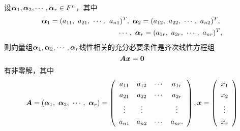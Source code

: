 \begin{frame}
\begin{dingli}
  设$\boldsymbol{\alpha}_1,\boldsymbol{\alpha}_2,\cdots,\boldsymbol{\alpha}_r\in F^n$，其中
  $$
  \begin{aligned}
    \boldsymbol{\alpha}_1 = (a_{11},~a_{21},~\cdots,~a_{n1})^T,~
    \boldsymbol{\alpha}_2 = (a_{12},~a_{22},~\cdots,~a_{n2})^T,~\\
    \cdots,~
    \boldsymbol{\alpha}_r = (a_{1r},~a_{2r},~\cdots,~a_{nr})^T,
  \end{aligned}
  $$
  则向量组$\boldsymbol{\alpha}_1,\boldsymbol{\alpha}_2,\cdots,\boldsymbol{\alpha}_r$线性相关的充分必要条件是齐次线性方程组
  \begin{equation}\label{ax}
    \boldsymbol{A} {\boldsymbol{x}} = \boldsymbol{0}
  \end{equation}
  有非零解，其中
  $$
  \boldsymbol{A} = (\boldsymbol{\alpha}_1,~\boldsymbol{\alpha}_2,~\cdots,~\boldsymbol{\alpha}_r) = \left(
    \begin{array}{cccc}
      a_{11}&a_{12}&\cdots&a_{1r}\\[0.05in]
      a_{21}&a_{22}&\cdots&a_{2r}\\[0.05in]
      \vdots&\vdots&&\vdots\\[0.05in]
      a_{n1}&a_{n2}&\cdots&a_{nr}.
    \end{array}\right), {\boldsymbol{x}} = \left(
    \begin{array}{c}
      x_1\\[0.05in]
      x_2\\[0.05in]
      \vdots\\[0.05in]
      x_r
    \end{array}
  \right)
  $$
\end{dingli}
\end{frame}  

